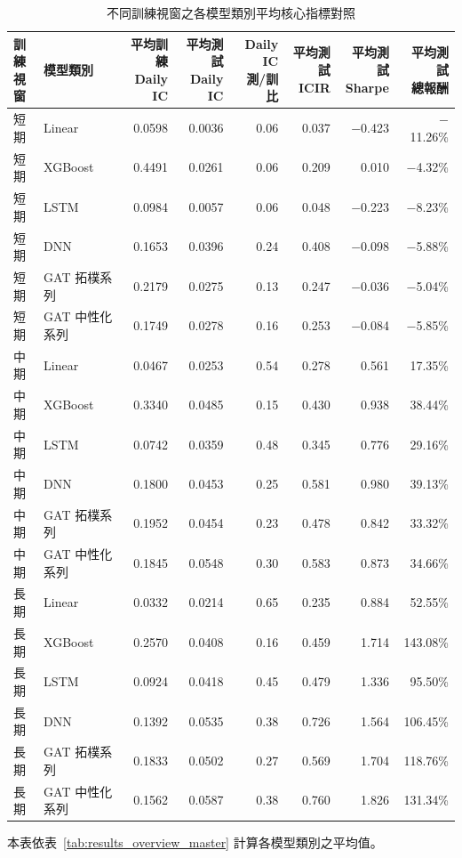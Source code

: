 \begin{table}[H]
\centering
\caption{不同訓練視窗之各模型類別平均核心指標對照}
\label{tab:results_portfolio_metrics}
\begingroup
\scriptsize
\setlength{\tabcolsep}{4pt}
\renewcommand{\arraystretch}{1.10}
\begin{adjustbox}{max width=\textwidth}
\begin{tabular}{@{}llrrrrrr@{}}
\toprule
\makecell[l]{訓練\\視窗} & 模型類別 & \makecell[r]{平均訓練\\Daily IC} & \makecell[r]{平均測試\\Daily IC} & \makecell[r]{Daily IC\\測/訓比} & \makecell[r]{平均測試\\ICIR} & \makecell[r]{平均測試\\Sharpe} & \makecell[r]{平均測試\\總報酬} \\
\midrule
短期 & Linear & 0.0598 & 0.0036 & 0.06 & 0.037 & $-$0.423 & $-$11.26\% \\
短期 & XGBoost & 0.4491 & 0.0261 & 0.06 & 0.209 & 0.010 & $-$4.32\% \\
短期 & LSTM & 0.0984 & 0.0057 & 0.06 & 0.048 & $-$0.223 & $-$8.23\% \\
短期 & DNN & 0.1653 & 0.0396 & 0.24 & 0.408 & $-$0.098 & $-$5.88\% \\
短期 & GAT 拓樸系列 & 0.2179 & 0.0275 & 0.13 & 0.247 & $-$0.036 & $-$5.04\% \\
短期 & GAT 中性化系列 & 0.1749 & 0.0278 & 0.16 & 0.253 & $-$0.084 & $-$5.85\% \\
\midrule
中期 & Linear & 0.0467 & 0.0253 & 0.54 & 0.278 & 0.561 & 17.35\% \\
中期 & XGBoost & 0.3340 & 0.0485 & 0.15 & 0.430 & 0.938 & 38.44\% \\
中期 & LSTM & 0.0742 & 0.0359 & 0.48 & 0.345 & 0.776 & 29.16\% \\
中期 & DNN & 0.1800 & 0.0453 & 0.25 & 0.581 & 0.980 & 39.13\% \\
中期 & GAT 拓樸系列 & 0.1952 & 0.0454 & 0.23 & 0.478 & 0.842 & 33.32\% \\
中期 & GAT 中性化系列 & 0.1845 & 0.0548 & 0.30 & 0.583 & 0.873 & 34.66\% \\
\midrule
長期 & Linear & 0.0332 & 0.0214 & 0.65 & 0.235 & 0.884 & 52.55\% \\
長期 & XGBoost & 0.2570 & 0.0408 & 0.16 & 0.459 & 1.714 & 143.08\% \\
長期 & LSTM & 0.0924 & 0.0418 & 0.45 & 0.479 & 1.336 & 95.50\% \\
長期 & DNN & 0.1392 & 0.0535 & 0.38 & 0.726 & 1.564 & 106.45\% \\
長期 & GAT 拓樸系列 & 0.1833 & 0.0502 & 0.27 & 0.569 & 1.704 & 118.76\% \\
長期 & GAT 中性化系列 & 0.1562 & 0.0587 & 0.38 & 0.760 & 1.826 & 131.34\% \\
\bottomrule
\end{tabular}
\end{adjustbox}
\smallskip

{\footnotesize 本表依表~\ref{tab:results_overview_master} 計算各模型類別之平均值。}
\endgroup
\end{table}
